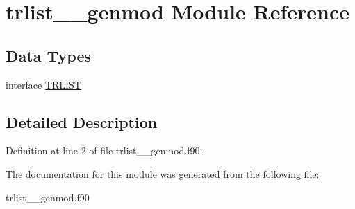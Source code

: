 \hypertarget{classtrlist____genmod}{\section{trlist\+\_\+\+\_\+genmod Module Reference}
\label{classtrlist____genmod}
}
\subsection*{Data Types}
\begin{DoxyCompactItemize}
\item 
interface \hyperlink{interfacetrlist____genmod_1_1_t_r_l_i_s_t}{T\+R\+L\+I\+S\+T}
\end{DoxyCompactItemize}


\subsection{Detailed Description}


Definition at line 2 of file trlist\+\_\+\+\_\+genmod.\+f90.



The documentation for this module was generated from the following file\+:\begin{DoxyCompactItemize}
\item 
trlist\+\_\+\+\_\+genmod.\+f90\end{DoxyCompactItemize}
